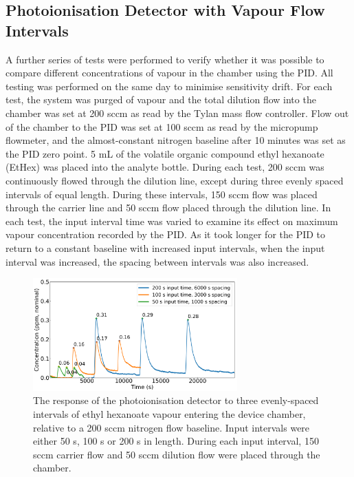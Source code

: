 \documentclass[
  a4paper,
]{scrbook}
\begin{document}
\hypertarget{photoionisation-detector-with-vapour-flow-intervals}{%
\subsection{Photoionisation Detector with Vapour Flow
Intervals}\label{photoionisation-detector-with-vapour-flow-intervals}}

A further series of tests were performed to verify whether it was
possible to compare different concentrations of vapour in the chamber
using the PID. All testing was performed on the same day to minimise
sensitivity drift. For each test, the system was purged of vapour and
the total dilution flow into the chamber was set at 200 sccm as read by
the Tylan mass flow controller. Flow out of the chamber to the PID was
set at 100 sccm as read by the micropump flowmeter, and the
almost-constant nitrogen baseline after 10 minutes was set as the PID
zero point. 5 mL of the volatile organic compound ethyl hexanoate
(EtHex) was placed into the analyte bottle. During each test, 200 sccm
was continuously flowed through the dilution line, except during three
evenly spaced intervals of equal length. During these intervals, 150
sccm flow was placed through the carrier line and 50 sccm flow placed
through the dilution line. In each test, the input interval time was
varied to examine its effect on maximum vapour concentration recorded by
the PID. As it took longer for the PID to return to a constant baseline
with increased input intervals, when the input interval was increased,
the spacing between intervals was also increased.

\begin{figure}

{\centering \includegraphics[width=0.7\textwidth,height=\textheight]{figures/ch9/input_time_comparison_PID.png}

}

\caption[The response of the photoionisation detector to three
evenly-spaced intervals of ethyl hexanoate vapour entering the device
chamber, relative to a 200 sccm nitrogen flow
baseline.]{\label{fig-concentration-comparison}The response of the
photoionisation detector to three evenly-spaced intervals of ethyl
hexanoate vapour entering the device chamber, relative to a 200 sccm
nitrogen flow baseline. Input intervals were either 50 s, 100 s or 200 s
in length. During each input interval, 150 sccm carrier flow and 50 sccm
dilution flow were placed through the chamber.}

\end{figure}
\end{document}
